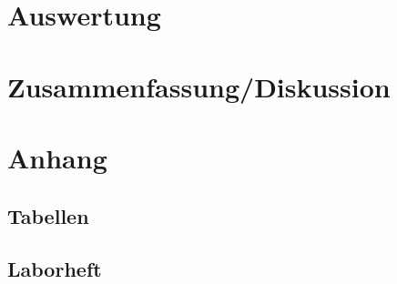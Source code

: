 \documentclass[12pt]{article}
\begin{document}
\newpage
\section{Auswertung}


\newpage
\section{Zusammenfassung/Diskussion}


\newpage
\section{Anhang}

\subsection{Tabellen}

%


%

\newpage
\subsection{Laborheft}

\newpage
\listoffigures


\newpage
\thispagestyle{empty}
\begin{thebibliography}{9}

  

  
  

\end{thebibliography}
\end{document}
